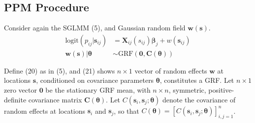 \documentclass{article}
\begin{document}
\subsection{PPM Procedure}

Consider again the SGLMM (5), and Gaussian random field $\pmb{w}(\pmb{s})$.
\begin{align}
\text{logit}(p_{ij}|\pmb{s}_{ij}) &= \pmb{X}_{ij}(s_{ij}) \pmb{\beta}_{j} + w(\pmb{s}_{ij}) \\
\pmb{w}(\pmb{s}) | \pmb{\theta} &\sim \text{GRF}(\pmb{0}, \pmb{C}(\pmb{\theta}))
\end{align}

Define (20) as in (5), and (21) shows $n \times 1$ vector of random effects $\pmb{w}$ at locations $\pmb{s}$, conditioned on covariance parameters $\pmb{\theta}$, constitutes a GRF. Let $n \times 1$ zero vector $\pmb{0}$ be the stationary GRF mean, with $n \times n$, symmetric, positive-definite covariance matrix $\pmb{C}(\pmb{\theta})$. Let $C(\pmb{s}_{i}, \pmb{s}_{j}; \pmb{\theta})$ denote the covariance of random effects at locations $\pmb{s}_{i}$ and $\pmb{s}_{j}$, so that $C(\pmb{\theta}) = [C(\pmb{s}_{i}, \pmb{s}_{j}; \pmb{\theta})]_{i,j=1}^{n}$.
\end{document}
